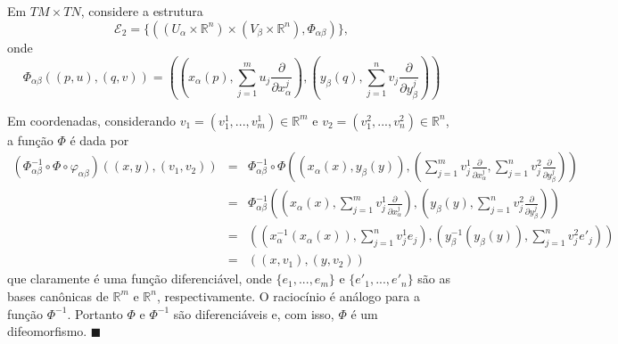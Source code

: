 \documentclass[twoside,openright,titlepage,numbers=noenddot,headinclude,  lineheaders footinclude=true,cleardoublepage=empty,BCOR=5mm,paper=a4,fontsize=12pt ]{scrbook}
\newcommand*{\QEDA}{\hfill\ensuremath{\blacksquare}}
\newcommand{\R}{\mathbb R}
\begin{document}
Em $TM \times TN$, considere a estrutura 
\begin{equation*}
    \mathcal{E}_2 = \{((U_{\alpha} \times \R^n) \times( V_{\beta} \times \R^n), \Phi_{\alpha \beta})\},
\end{equation*}
onde 
\begin{equation*}
    \Phi_{\alpha \beta}((p,u),(q,v)) = \left(\left(x_{\alpha}(p),\sum_{j=1}^m u_j \frac{\partial}{\partial x_{\alpha}^j}\right),\left(y_{\beta}(q), \sum_{j=1}^n v_j \frac{\partial}{\partial y_{\beta}^j}\right)\right)
\end{equation*}

Em coordenadas, considerando $v_1 = (v^1_1,...,v^1_m) \in \R^m$ e $v_2 = (v_1^2,...,v_n^2) \in \R^n$, a função $\Phi$ é dada por 
\begin{eqnarray*}
    (\Phi_{\alpha \beta}^{-1} \circ \Phi \circ \varphi_{\alpha \beta})((x,y),(v_1,v_2)) &=& \Phi_{\alpha \beta}^{-1} \circ \Phi\left((x_{\alpha}(x),y_{\beta}(y)),\left(\sum_{j=1}^m v_j^1 \frac{\partial}{\partial x_{\alpha}^j}, \sum_{j=1}^n v_j^2 \frac{\partial}{\partial y_{\beta}^j}\right)\right)\\
    &=&\Phi^{-1}_{\alpha \beta}\left(\left(x_{\alpha}(x),\sum_{j=1}^m v_j^1 \frac{\partial}{\partial x_{\alpha}^j}\right), \left(y_{\beta}(y), \sum_{j=1}^n v_j^2 \frac{\partial}{\partial y_{\beta}^j}\right)\right)\\
    &=&\left(\left(x^{-1}_{\alpha}(x_{\alpha}(x)),\sum_{j=1}^n v^1_j e_j\right), \left(y^{-1}_{\beta}(y_{\beta}(y)),\sum_{j=1}^n v^2_j e'_j\right)\right)\\
    &=&((x,v_1),(y,v_2))
\end{eqnarray*}
que claramente é uma função diferenciável, onde $\{e_1,...,e_m\}$ e $\{e'_1,...,e'_n\}$ são as bases canônicas de $\R^m$ e $\R^n$, respectivamente. O raciocínio é análogo para a função $\Phi^{-1}$. Portanto $\Phi$ e $\Phi^{-1}$ são diferenciáveis e, com isso, $\Phi$ é um difeomorfismo. \QEDA
\end{document}
